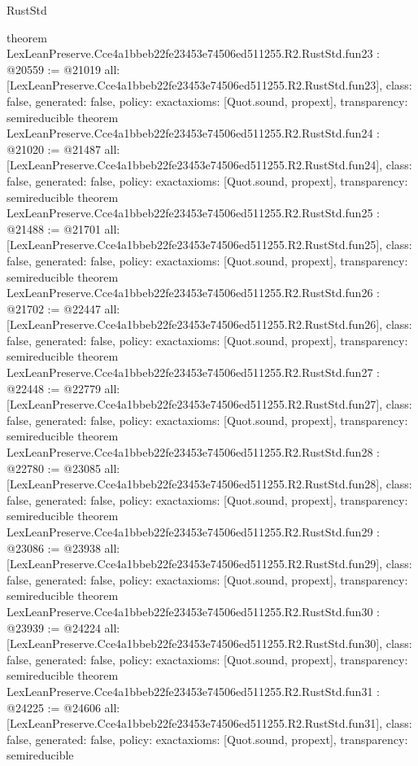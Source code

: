\begin{lexlean}{RustStd}
\begin{coremodule}
{}
theorem LexLeanPreserve.Cce4a1bbeb22fe23453e74506ed511255.R2.RustStd.fun23 : @20559 := @21019 {
  all: [LexLeanPreserve.Cce4a1bbeb22fe23453e74506ed511255.R2.RustStd.fun23],
  class: false,
  generated: false,
  policy: exact{axioms: [Quot.sound, propext]},
  transparency: semireducible
}
theorem LexLeanPreserve.Cce4a1bbeb22fe23453e74506ed511255.R2.RustStd.fun24 : @21020 := @21487 {
  all: [LexLeanPreserve.Cce4a1bbeb22fe23453e74506ed511255.R2.RustStd.fun24],
  class: false,
  generated: false,
  policy: exact{axioms: [Quot.sound, propext]},
  transparency: semireducible
}
theorem LexLeanPreserve.Cce4a1bbeb22fe23453e74506ed511255.R2.RustStd.fun25 : @21488 := @21701 {
  all: [LexLeanPreserve.Cce4a1bbeb22fe23453e74506ed511255.R2.RustStd.fun25],
  class: false,
  generated: false,
  policy: exact{axioms: [Quot.sound, propext]},
  transparency: semireducible
}
theorem LexLeanPreserve.Cce4a1bbeb22fe23453e74506ed511255.R2.RustStd.fun26 : @21702 := @22447 {
  all: [LexLeanPreserve.Cce4a1bbeb22fe23453e74506ed511255.R2.RustStd.fun26],
  class: false,
  generated: false,
  policy: exact{axioms: [Quot.sound, propext]},
  transparency: semireducible
}
theorem LexLeanPreserve.Cce4a1bbeb22fe23453e74506ed511255.R2.RustStd.fun27 : @22448 := @22779 {
  all: [LexLeanPreserve.Cce4a1bbeb22fe23453e74506ed511255.R2.RustStd.fun27],
  class: false,
  generated: false,
  policy: exact{axioms: [Quot.sound, propext]},
  transparency: semireducible
}
theorem LexLeanPreserve.Cce4a1bbeb22fe23453e74506ed511255.R2.RustStd.fun28 : @22780 := @23085 {
  all: [LexLeanPreserve.Cce4a1bbeb22fe23453e74506ed511255.R2.RustStd.fun28],
  class: false,
  generated: false,
  policy: exact{axioms: [Quot.sound, propext]},
  transparency: semireducible
}
theorem LexLeanPreserve.Cce4a1bbeb22fe23453e74506ed511255.R2.RustStd.fun29 : @23086 := @23938 {
  all: [LexLeanPreserve.Cce4a1bbeb22fe23453e74506ed511255.R2.RustStd.fun29],
  class: false,
  generated: false,
  policy: exact{axioms: [Quot.sound, propext]},
  transparency: semireducible
}
theorem LexLeanPreserve.Cce4a1bbeb22fe23453e74506ed511255.R2.RustStd.fun30 : @23939 := @24224 {
  all: [LexLeanPreserve.Cce4a1bbeb22fe23453e74506ed511255.R2.RustStd.fun30],
  class: false,
  generated: false,
  policy: exact{axioms: [Quot.sound, propext]},
  transparency: semireducible
}
theorem LexLeanPreserve.Cce4a1bbeb22fe23453e74506ed511255.R2.RustStd.fun31 : @24225 := @24606 {
  all: [LexLeanPreserve.Cce4a1bbeb22fe23453e74506ed511255.R2.RustStd.fun31],
  class: false,
  generated: false,
  policy: exact{axioms: [Quot.sound, propext]},
  transparency: semireducible
}
\end{coremodule}
\end{lexlean}
